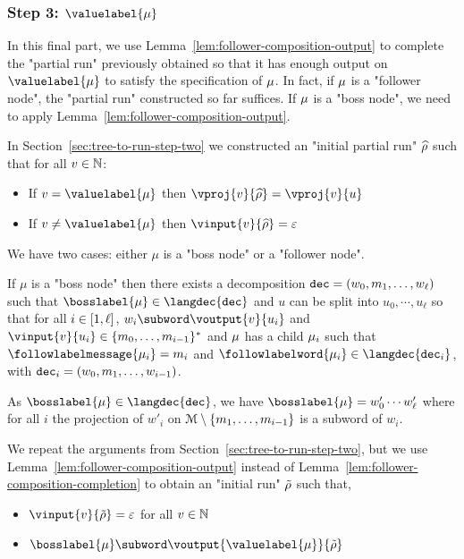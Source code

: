 \subsubsection{Step 3: $\valuelabel{\node}$}

In this final part, we use Lemma~\ref{lem:follower-composition-output} to complete the "partial run" previously obtained so that it has enough output on $\valuelabel{\node}$ to satisfy the specification of $\mu$. In fact, if $\mu$ is a "follower node", the "partial run" constructed so far suffices. If $\mu$ is a "boss node", we need to apply Lemma~\ref{lem:follower-composition-output}.
	
In Section~\ref{sec:tree-to-run-step-two} we constructed an "initial partial run" $\widehat{\rho}$ such that for all $v \in \mathbb{N}$:
\begin{itemize}
	\item If $v = \valuelabel{\node}$ then $\vproj{v}{\widehat{\run}} = \vproj{v}{u}$
	
	\item If $v \neq \valuelabel{\node}$ then $\vinput{v}{\widehat{\run}} = \epsilon$
\end{itemize}  

We have two cases: either $\mu$ is a "boss node" or a "follower node".

If $\mu$ is a "boss node" then there exists a decomposition $\mathtt{dec}=(w_0, m_1, \ldots, w_\ell)$ such that $\bosslabel{\node} \in \langdec{\decsymb}$ and $u$ can be split into $u_0, \cdots, u_\ell$ so that for all $i \in [1,\ell]$, $w_i \subword \voutput{v}{u_i}$ and $\vinput{v}{u_i} \in \set{m_0, \ldots, m_{i-1}}^*$ and $\mu$ has a child $\mu_i$ such that $\followlabelmessage{\mu_i} = m_i$ and $\followlabelword{\node_i} \in \langdec{\decsymb_i}$, with $\mathtt{dec}_i = (w_0, m_1, \ldots, w_{i-1})$.

As $\bosslabel{\node} \in \langdec{\decsymb}$, we have $\bosslabel{\node} = w'_0 \cdots w'_\ell$ where for all $i$ the projection of $w'_i$ on $\mathcal{M}\setminus\{m_1, \ldots, m_{i-1}\}$ is a subword of $w_i$. 

We repeat the arguments from Section~\ref{sec:tree-to-run-step-two}, but we use Lemma~\ref{lem:follower-composition-output} instead of Lemma~\ref{lem:follower-composition-completion} to obtain an "initial run" $\Tilde{\rho}$ such that,
\begin{itemize}	
	\item $\vinput{v}{\Tilde{\run}} = \epsilon$ for all $v \in \mathbb{N}$
	
	\item $\bosslabel{\node} \subword \voutput{\valuelabel{\node}}{\Tilde{\run}}$
\end{itemize}

